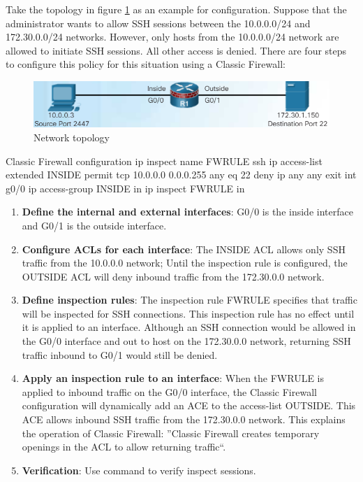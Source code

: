 Take the topology in figure \ref{ClassicConfig} as an example for configuration. Suppose that the administrator wants to allow SSH sessions between the 10.0.0.0/24 and 172.30.0.0/24 networks. However, only hosts from the 10.0.0.0/24 network are allowed to initiate SSH sessions. All other access is denied. There are four steps to configure this policy for this situation using a Classic Firewall:

\begin{figure}[hbtp]
\caption{Network topology}\label{ClassicConfig}
\centering
\includegraphics[width=10\xm]{pictures/ClassicConfig.PNG}
\end{figure}


\begin{sexylisting}{Classic Firewall configuration}
ip inspect name FWRULE ssh
ip access-list extended INSIDE
	permit tcp 10.0.0.0 0.0.0.255 any eq 22
	deny ip any any
	exit
int g0/0
	ip access-group INSIDE in
	ip inspect FWRULE in	
\end{sexylisting}



\begin{enumerate}
\item \textbf{Define the internal and external interfaces}: G0/0 is the inside interface and G0/1 is the outside interface.
\item \textbf{Configure ACLs for each interface}: The INSIDE ACL allows only SSH traffic from the 10.0.0.0 network; Until the inspection rule is configured, the OUTSIDE ACL will deny inbound traffic from the 172.30.0.0 network.
\item \textbf{Define inspection rules}: The inspection rule FWRULE specifies that traffic will be inspected for SSH connections. This inspection rule has no effect until it is applied to an interface. Although an SSH connection would be allowed in the G0/0 interface and out to host on the 172.30.0.0 network, returning SSH traffic inbound to G0/1 would still be denied.
\item \textbf{Apply an inspection rule to an interface}: When the FWRULE is applied to inbound traffic on the G0/0 interface, the Classic Firewall configuration will dynamically add an ACE to the access-list OUTSIDE. This ACE allows inbound SSH traffic from the 172.30.0.0 network. This explains the operation of Classic Firewall: ''Classic Firewall creates temporary openings in the ACL to allow returning traffic``.
\item \textbf{Verification}: Use  command to verify inspect sessions.
\end{enumerate}

